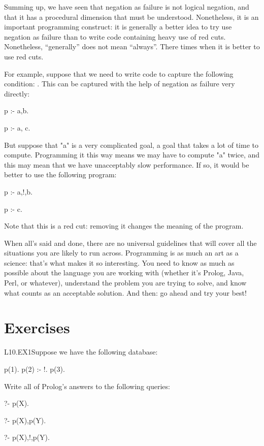Summing up, we have seen that negation as failure is not logical
negation, and that it has a procedural dimension that must be
understood.  Nonetheless, it is an important programming construct: it
is generally a better idea to try use negation as failure than to
write code containing heavy use of red cuts.  Nonetheless,
``generally'' does not mean ``always''.  There  times
when it is better to use red cuts.


For example, suppose that we need to
write code to capture the following condition:
. This can be captured with the help of negation
as failure very directly:

\begin{LPNcodedisplay}
p :- a,b.

p :- \+ a, c.
\end{LPNcodedisplay}

But suppose that "a" is a very complicated goal, a goal that
takes a lot of time to compute.  Programming it this way means we may
have to compute "a" twice, and this may mean that we have
unacceptably slow performance. If so, it would be better to use the
following program:

\begin{LPNcodedisplay}
p :- a,!,b.

p :- c.
\end{LPNcodedisplay}

Note that this is a red cut: removing it changes the meaning
of the program.

When all's said and done, there are no universal guidelines that will
cover all the situations you are likely to run across.  Programming is
as much an art as a science: that's what makes it so interesting.
You need to know as much as possible about the language you are
working with (whether it's Prolog, Java, Perl, or whatever), understand
the problem you are trying to solve, and know what counts as an
acceptable solution. And then: go ahead and try your best!




\section{Exercises}\label{SEC.L10.EXERCISES}

\begin{LPNexercise}{L10.EX1}Suppose we have the following database:
\begin{LPNcodedisplay}
p(1).
p(2) :- !.
p(3).
\end{LPNcodedisplay}

Write all of Prolog's answers to the following queries:
\begin{LPNcodedisplay}
?- p(X).

?- p(X),p(Y).

?- p(X),!,p(Y).
\end{LPNcodedisplay}
\end{LPNexercise}


